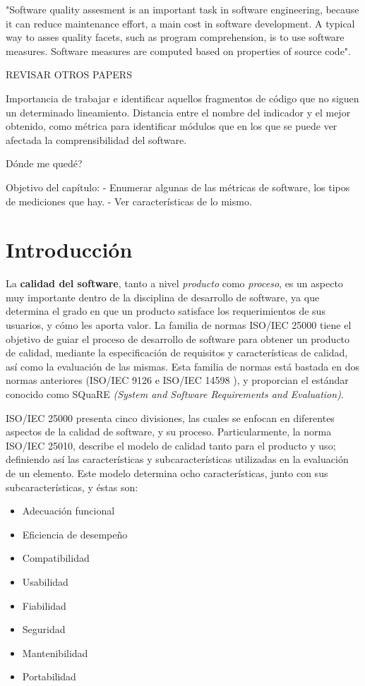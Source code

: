 "Software quality assesment is an important task in software engineering, because it can
reduce maintenance effort, a main cost in software development.
A typical way to asses quality facets, such as program comprehension, is to use software
measures.
Software measures are computed based on properties of source code"\cite{Feigenspan2011}.

REVISAR OTROS PAPERS

Importancia de trabajar e identificar aquellos fragmentos de código que no siguen un
determinado lineamiento.
Distancia entre el nombre del indicador y el mejor obtenido, como métrica para identificar
módulos que en los que se puede ver afectada la comprensibilidad del software.

Dónde me quedé?

Objetivo del capítulo:
- Enumerar algunas de las métricas de software, los tipos de mediciones que hay.
- Ver características de lo mismo.

\section{Introducción}

La \textbf{calidad del software}, tanto a nivel \textit{producto} como \textit{proceso}, 
es un aspecto muy importante dentro de la disciplina de desarrollo de software, ya que
determina el grado en que un producto satisface los requerimientos de sus usuarios, y cómo
les aporta valor.
La familia de normas ISO/IEC 25000 \cite{ref} tiene el objetivo de guiar el proceso de
desarrollo de software para obtener un producto de calidad, mediante la especificación 
de requisitos y características de calidad, así como la evaluación de las mismas.
Esta familia de normas está bastada en dos normas anteriores (ISO/IEC 9126 \cite{ref}
e ISO/IEC 14598 \cite{ref}), y proporcian el estándar conocido como SQuaRE 
\textit{(System and Software Requirements and Evaluation)}.

ISO/IEC 25000 presenta cinco divisiones, las cuales se enfocan en diferentes aspectos
de la calidad de software, y su proceso.
Particularmente, la norma ISO/IEC 25010, describe el modelo de calidad tanto para el producto
y uso; definiendo así las características y subcaracterísticas utilizadas en la evaluación
de un elemento.
Este modelo determina ocho características, junto con sus subcaracterísticas, y éstas son:
\begin{itemize}
    \item Adecuación funcional
    \item Eficiencia de desempeño
    \item Compatibilidad
    \item Usabilidad
    \item Fiabilidad
    \item Seguridad
    \item Mantenibilidad
    \item Portabilidad
\end{itemize}

